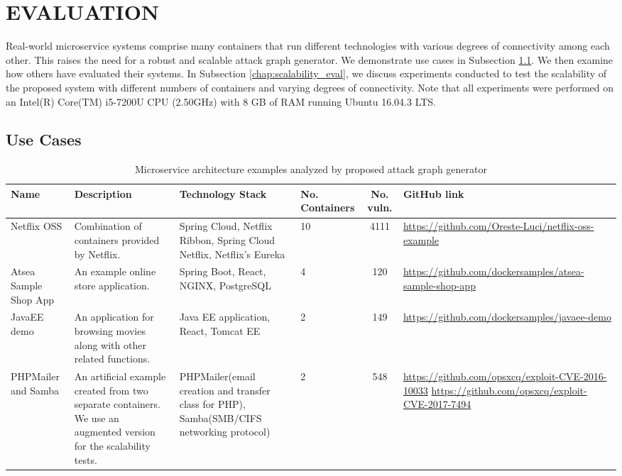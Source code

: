 
\section{EVALUATION}
\label{chap:eval}

Real-world microservice systems comprise many containers that run different technologies with various degrees of connectivity among each other. This raises the need for a robust and scalable attack graph generator. We demonstrate use cases in Subsection \ref{chap:heterogenious_systems}. We then examine how others have evaluated their systems. In Subsection \ref{chap:scalability_eval}, we discuss experiments conducted to test the scalability of the proposed system with different numbers of containers and varying degrees of connectivity. Note that all experiments were performed on an Intel(R) Core(TM) i5-7200U CPU (2.50GHz) with 8 GB of RAM running Ubuntu 16.04.3 LTS.

\subsection{Use Cases}
\label{chap:heterogenious_systems}
\begin{table*}[!htb]
	\begin{center}
		\begin{tabular}{ p{20mm}p{35mm}p{35mm}p{10mm}cp{35mm} } 
			\hline
			Name & Description & Technology Stack & No. Containers & No. vuln. & GitHub link \\\hline 
			
			Netflix OSS & Combination of containers provided by Netflix. & Spring Cloud, Netflix Ribbon, Spring Cloud Netflix, Netflix's Eureka & 10 & 4111 & \url{https://github.com/Oreste-Luci/netflix-oss-example} \\
			
			Atsea Sample Shop App & An example online store application. & Spring Boot, React, NGINX, PostgreSQL & 4 & 120 & \url{https://github.com/dockersamples/atsea-sample-shop-app} \\
			
			JavaEE demo & An application for browsing movies along with other related functions. & Java EE application, React, Tomcat EE & 2 & 149 & \url{https://github.com/dockersamples/javaee-demo} \\
			
			PHPMailer and Samba & An artificial example created from two separate containers. We use an augmented version for the scalability tests. & PHPMailer(email creation and transfer class for PHP), Samba(SMB/CIFS networking protocol) & 2 & 548 &  \url{https://github.com/opsxcq/exploit-CVE-2016-10033}
			\url{https://github.com/opsxcq/exploit-CVE-2017-7494} \\
			
			
			\hline
		\end{tabular}
	\end{center}
	
	\caption{Microservice architecture examples analyzed by proposed attack graph generator}
	\label{table_technologies}
	
\end{table*}



